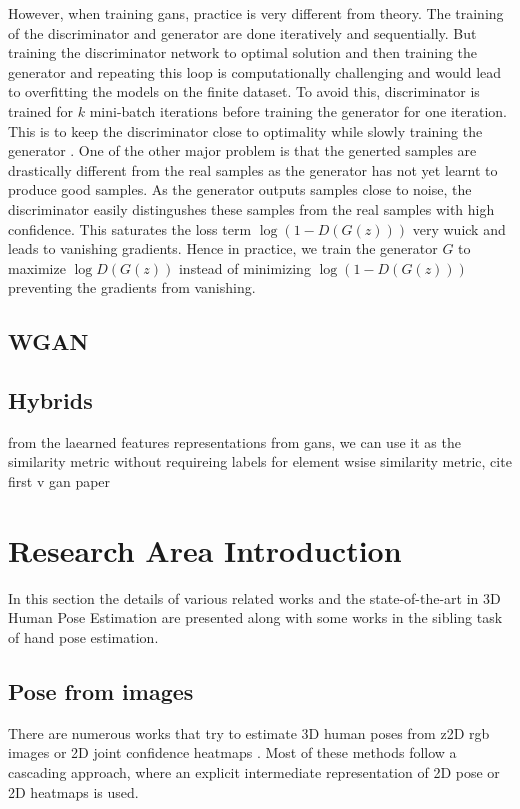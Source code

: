 However, when training \acp{gan}, practice is very different from theory. The training of the discriminator and generator are done iteratively and sequentially. But training the discriminator network to optimal solution and then training the generator and repeating this loop is computationally challenging and would lead to overfitting the models on the finite dataset. To avoid this, discriminator is trained for $k$ mini-batch iterations before training the generator for one iteration. This is to keep the discriminator close to optimality while slowly training the generator \cite{goodfellow2014generative}. One of the other major problem is that the generted samples are drastically different from the real samples as the generator has not yet learnt to produce good samples. As the generator outputs samples close to noise, the discriminator easily distingushes these samples from the real samples with high confidence. This saturates the loss term $\log (1-D(G(z)))$ very wuick and leads to vanishing gradients. Hence in practice, we train the generator $G$ to maximize $\log D(G(z))$ instead of minimizing $\log (1-D(G(z)))$ preventing the gradients from vanishing.

\subsection{WGAN}


\subsection{Hybrids}

from the laearned features representations from gans, we can use it as the similarity metric without requireing labels for element wsise similarity metric, cite first v gan paper \cite{autoencoding_beyond_pixels}

\lipsum[1-4] %

\section{Research Area Introduction}
\label{sec:Research area introduction}

In this section the details of various related works and the state-of-the-art in 3D Human Pose Estimation are presented along with some works in the sibling task of hand pose estimation.

\subsection{Pose from images}
There are numerous works that try to estimate 3D human poses from z2D \ac{rgb} images or 2D joint confidence heatmaps \cite{CameraDistanceAware, poselifter, DistillNRSfM, occlusionVideo}. Most of these methods follow a cascading approach, where an explicit intermediate representation of 2D pose or 2D heatmaps is used.

